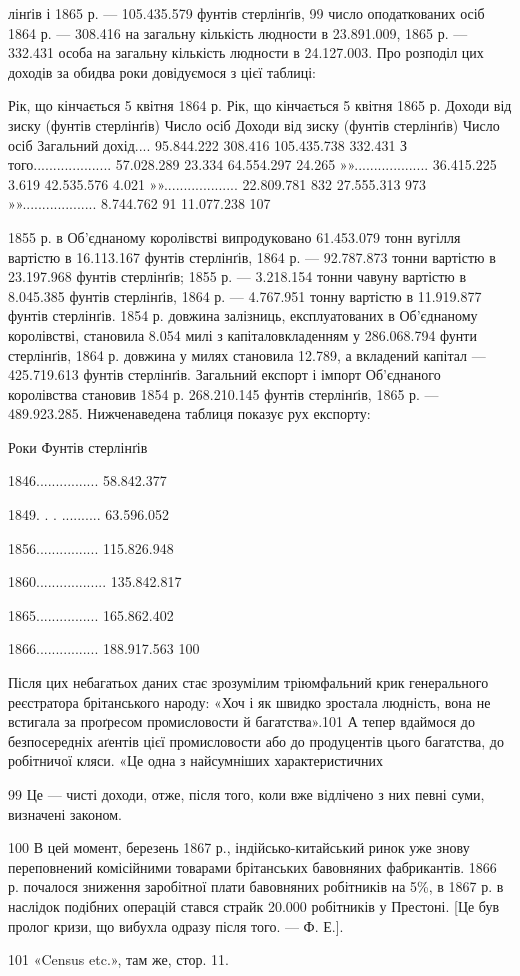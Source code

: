 лінґів і 1865 р. — 105.435.579 фунтів стерлінґів, 99 число оподаткованих
осіб 1864 р. — 308.416 на загальну кількість людности в
23.891.009, 1865 р. — 332.431 особа на загальну кількість людности
в 24.127.003. Про розподіл цих доходів за обидва роки
довідуємося з цієї таблиці:

    Рік, що кінчається 5 квітня 1864 р. Рік, що кінчається 5 квітня 1865 р.
    Доходи від зиску (фунтів стерлінґів) Число  осіб    Доходи від зиску (фунтів стерлінґів) Число 
осіб
Загальний дохід....  95.844.222   308.416   105.435.738   332.431
З того....................  57.028.289   23.334      64.554.297     24.265
»»...................  36.415.225   3.619        42.535.576     4.021
»»...................  22.809.781   832           27.555.313     973
»»...................  8.744.762      91             11.077.238     107

1855 р. в Об’єднаному королівстві випродуковано 61.453.079
тонн вугілля вартістю в 16.113.167 фунтів стерлінґів, 1864 р. —
92.787.873 тонни вартістю в 23.197.968 фунтів стерлінґів; 1855 р. —
3.218.154 тонни чавуну вартістю в 8.045.385 фунтів стерлінґів,
1864 р. — 4.767.951 тонну вартістю в 11.919.877 фунтів стерлінґів.
1854 р. довжина залізниць, експлуатованих в Об’єднаному
королівстві, становила 8.054 милі з капіталовкладенням
у 286.068.794 фунти стерлінґів, 1864 р. довжина у милях становила
12.789, а вкладений капітал — 425.719.613 фунтів стерлінґів.
Загальний експорт і імпорт Об’єднаного королівства
становив 1854 р. 268.210.145 фунтів стерлінґів, 1865 р. —
489.923.285. Нижченаведена таблиця показує рух експорту:

Роки    Фунтів стерлінґів

1846................ 58.842.377

1849. . . .......... 63.596.052

1856................ 115.826.948

1860.................. 135.842.817

1865................ 165.862.402

1866................ 188.917.563 100

Після цих небагатьох даних стає зрозумілим тріюмфальний
крик генерального реєстратора брітанського народу: «Хоч і
як швидко зростала людність, вона не встигала за проґресом промисловости
й багатства».101 А тепер вдаймося до безпосередніх
аґентів цієї промисловости або до продуцентів цього багатства,
до робітничої кляси. «Це одна з найсумніших характеристичних

99 Це — чисті доходи, отже, після того, коли вже відлічено з них
певні суми, визначені законом.

100    В цей момент, березень 1867 р., індійсько-китайський ринок
уже знову переповнений комісійними товарами брітанських бавовняних
фабрикантів. 1866 р. почалося зниження заробітної плати бавовняних
робітників на 5\%, в 1867 р. в наслідок подібних операцій стався страйк
20.000 робітників у Престоні. [Це був пролог кризи, що вибухла одразу
після того. — Ф. Е.].

101 «Census etc.», там же, стор. 11.
